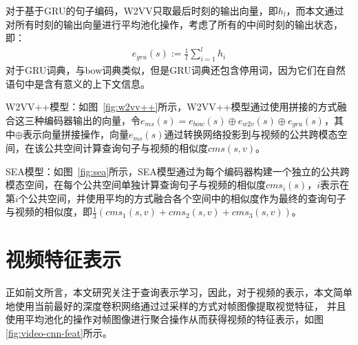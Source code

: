 对于基于GRU的句子编码，W2VV只取最后时刻的输出向量，即$h_l$，而本文通过对所有时刻的输出向量进行平均池化操作，考虑了所有的中间时刻的输出状态，即：
\begin{equation}
    \label{eq:gru-mean}
    \begin{aligned}
        e_{gru}(s) := \frac{1}{l}\sum^l_{i=1}h_i
    \end{aligned}
\end{equation}
对于GRU词典，与bow词典类似，但是GRU词典还包含停用词，因为它们在自然语句中是含有意义的上下文信息。

W2VV++模型：如图~\ref{fig:w2vv++}所示，W2VV++模型通过使用拼接的方式融合这三种编码器输出的向量，令$e_{ms}(s)=e_{bow}(s) \oplus e_{w2v}(s) \oplus e_{gru}(s)$，其中$\oplus$表示向量拼接操作，向量$e_{ms}(s)$通过转换网络投影到与视频的公共跨模态空间，在该公共空间计算查询句子与视频的相似度$cms(s,v)$。

SEA模型：如图~\ref{fig:sea}所示，SEA模型通过为每个编码器构建一个独立的公共跨模态空间，在每个公共空间单独计算查询句子与视频的相似度$cms_i(s)$，$i$表示在第$i$个公共空间，并使用平均的方式融合各个空间中的相似度作为最终的查询句子与视频的相似度，即$\frac{1}{3}(cms_1(s,v)+cms_2(s,v)+cms_3(s,v))$。

%

\section{视频特征表示}
正如前文所言，本文研究关注于查询表示学习，因此，对于视频的表示，本文简单地使用当前最好的深度卷积网络通过过采样的方式对帧图像提取视觉特征，
并且使用平均池化的操作对帧图像进行聚合操作从而获得视频的特征表示，如图\ref{fig:video-cnn-feat}所示。

